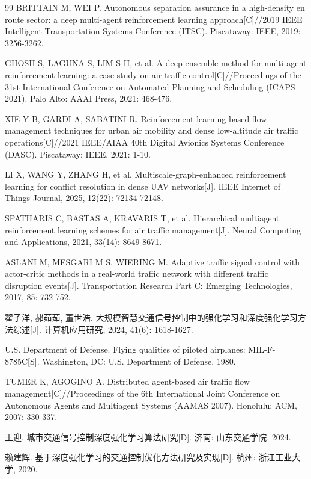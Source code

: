 \documentclass[12pt,a4paper,UTF8]{ctexart}
\begin{document}
\begin{thebibliography}{99}
 BRITTAIN M, WEI P. Autonomous separation assurance in a high-density en route sector: a deep multi-agent reinforcement learning approach[C]//2019 IEEE Intelligent Transportation Systems Conference (ITSC). Piscataway: IEEE, 2019: 3256-3262.

 GHOSH S, LAGUNA S, LIM S H, et al. A deep ensemble method for multi-agent reinforcement learning: a case study on air traffic control[C]//Proceedings of the 31st International Conference on Automated Planning and Scheduling (ICAPS 2021). Palo Alto: AAAI Press, 2021: 468-476.

 XIE Y B, GARDI A, SABATINI R. Reinforcement learning-based flow management techniques for urban air mobility and dense low-altitude air traffic operations[C]//2021 IEEE/AIAA 40th Digital Avionics Systems Conference (DASC). Piscataway: IEEE, 2021: 1-10.

 LI X, WANG Y, ZHANG H, et al. Multiscale-graph-enhanced reinforcement learning for conflict resolution in dense UAV networks[J]. IEEE Internet of Things Journal, 2025, 12(22): 72134-72148.

 SPATHARIS C, BASTAS A, KRAVARIS T, et al. Hierarchical multiagent reinforcement learning schemes for air traffic management[J]. Neural Computing and Applications, 2021, 33(14): 8649-8671.

 ASLANI M, MESGARI M S, WIERING M. Adaptive traffic signal control with actor-critic methods in a real-world traffic network with different traffic disruption events[J]. Transportation Research Part C: Emerging Technologies, 2017, 85: 732-752.

 翟子洋, 郝茹茹, 董世浩. 大规模智慧交通信号控制中的强化学习和深度强化学习方法综述[J]. 计算机应用研究, 2024, 41(6): 1618-1627.

 U.S. Department of Defense. Flying qualities of piloted airplanes: MIL-F-8785C[S]. Washington, DC: U.S. Department of Defense, 1980.

 TUMER K, AGOGINO A. Distributed agent-based air traffic flow management[C]//Proceedings of the 6th International Joint Conference on Autonomous Agents and Multiagent Systems (AAMAS 2007). Honolulu: ACM, 2007: 330-337.

 王迎. 城市交通信号控制深度强化学习算法研究[D]. 济南: 山东交通学院, 2024.

 赖建辉. 基于深度强化学习的交通控制优化方法研究及实现[D]. 杭州: 浙江工业大学, 2020.


\end{thebibliography}
\end{document}
